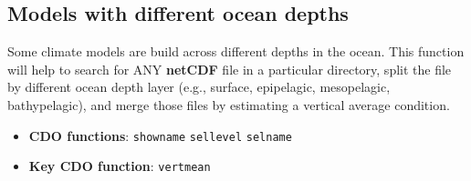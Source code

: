 \documentclass[]{book}
\providecommand{\tightlist}{%
  \setlength{\itemsep}{0pt}\setlength{\parskip}{0pt}}
\begin{document}
\hypertarget{models-with-different-ocean-depths}{%
\subsection{Models with different ocean depths}\label{models-with-different-ocean-depths}}

Some climate models are build across different depths in the ocean. This function will help to search for ANY \textbf{netCDF} file in a particular directory, split the file by different ocean depth layer (e.g., surface, epipelagic, mesopelagic, bathypelagic), and merge those files by estimating a vertical average condition.

\begin{itemize}
\tightlist
\item
  \textbf{CDO functions}: \texttt{showname} \texttt{sellevel} \texttt{selname}
\item
  \textbf{Key CDO function}: \texttt{vertmean}
\end{itemize}
\end{document}
